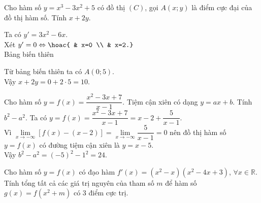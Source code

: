 \begin{bt}%
Cho hàm số $y=x^3-3x^2+5$ có đồ thị $(C)$, gọi $A(x;y)$ là điểm cực đại của đồ thị hàm số. Tính $x+2y$.
\loigiai
{
Ta có $y'=3x^2-6x$. \\
Xét $y'=0 \Leftrightarrow \hoac{ & x=0 \\ & x=2.}$ \\
Bảng biến thiên
\begin{center}
\end{center}
Từ bảng biến thiên ta có $A(0;5)$. \\
Vậy $x+2y=0+2\cdot5=10$.
}
\end{bt}

\begin{bt}%
Cho hàm số $y=f(x)=\dfrac{x^2-3x+7}{x-1}$. Tiệm cận xiên có dạng $y=ax+b$. Tính $b^2-a^2$.
\loigiai
{
Ta có $y=f(x)=\dfrac{x^2-3x+7}{x-1}=x-2+\dfrac{5}{x-1}$. \\
Vì $\lim\limits_{x\to-\infty} [f(x)-(x-2)]=\lim\limits_{x\to-\infty} \dfrac{5}{x-1}=0$ nên đồ thị hàm số $y=f(x)$ có đường tiệm cận xiên là $y=x-5$. \\
Vậy $b^2-a^2=\left(-5\right)^2-1^2=24$.
}
\end{bt}

\begin{bt}%
	Cho hàm số $y=f(x)$ có đạo hàm $f'(x)=\left(x^2-x\right)\left(x^2-4x+3\right)$, $\forall x \in \mathbb{R}$. Tính tổng tất cả các giá trị nguyên của tham số $m$ để hàm số $g(x)=f\left(x^2+m\right)$ có $3$ điểm cực trị.
\end{bt}

